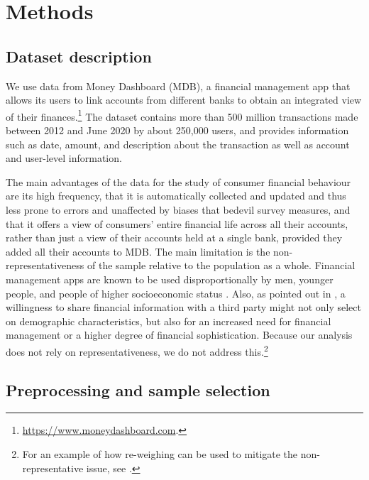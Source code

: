 
\section{Methods}%
\label{sec:methods}



\subsection{Dataset description}
\label{par:dataset_description}

We use data from Money Dashboard (MDB), a financial management app that allows
its users to link accounts from different banks to obtain an integrated view of
their
finances.\footnote{\href{https://www.moneydashboard.com}{https://www.moneydashboard.com}.}
The dataset contains more than 500 million transactions made between 2012 and
June 2020 by about 250,000 users, and provides information such as date,
amount, and description about the transaction as well as account and user-level
information.

The main advantages of the data for the study of consumer financial behaviour
are its high frequency, that it is automatically collected and updated and thus
less prone to errors and unaffected by biases that bedevil survey measures, and
that it offers a view of consumers' entire financial life across all their
accounts, rather than just a view of their accounts held at a single bank,
provided they added all their accounts to MDB. The main limitation is the
non-representativeness of the sample relative to the population as a whole.
Financial management apps are known to be used disproportionally by men,
younger people, and people of higher socioeconomic status
\citep{carlin2019generational}. Also, as pointed out in
\citet{gelman2014harnessing}, a willingness to share financial information with
a third party might not only select on demographic characteristics, but also
for an increased need for financial management or a higher degree of financial
sophistication. Because our analysis does not rely on representativeness, we do
not address this.\footnote{For an example of how re-weighing can be used to
mitigate the non-representative issue, see \citet{bourquin2020effects}.}



\subsection{Preprocessing and sample selection}%
\label{par:preprocessing_and_sample_selection}

